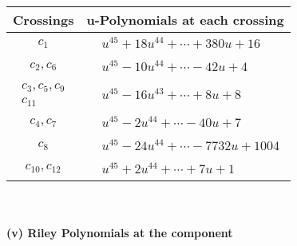 \documentclass[1p]{elsarticle_modified}
\theoremstyle{definition}
\begin{document}
\begin{tabular}{m{50pt}|m{274pt}}
Crossings & \hspace{64pt}u-Polynomials at each crossing \\
\hline $$\begin{aligned}c_{1}\end{aligned}$$&$\begin{aligned}
&u^{45}+18 u^{44}+\cdots+380 u+16
\end{aligned}$\\
\hline $$\begin{aligned}c_{2},c_{6}\end{aligned}$$&$\begin{aligned}
&u^{45}-10 u^{44}+\cdots-42 u+4
\end{aligned}$\\
\hline $$\begin{aligned}c_{3},c_{5},c_{9}\\c_{11}\end{aligned}$$&$\begin{aligned}
&u^{45}-16 u^{43}+\cdots+8 u+8
\end{aligned}$\\
\hline $$\begin{aligned}c_{4},c_{7}\end{aligned}$$&$\begin{aligned}
&u^{45}-2 u^{44}+\cdots-40 u+7
\end{aligned}$\\
\hline $$\begin{aligned}c_{8}\end{aligned}$$&$\begin{aligned}
&u^{45}-24 u^{44}+\cdots-7732 u+1004
\end{aligned}$\\
\hline $$\begin{aligned}c_{10},c_{12}\end{aligned}$$&$\begin{aligned}
&u^{45}+2 u^{44}+\cdots+7 u+1
\end{aligned}$\\
\hline
\end{tabular}\\~\\
\newpage\renewcommand{\arraystretch}{1}
\flushleft \textbf{(v) Riley Polynomials at the component}\newline \\
\end{document}
